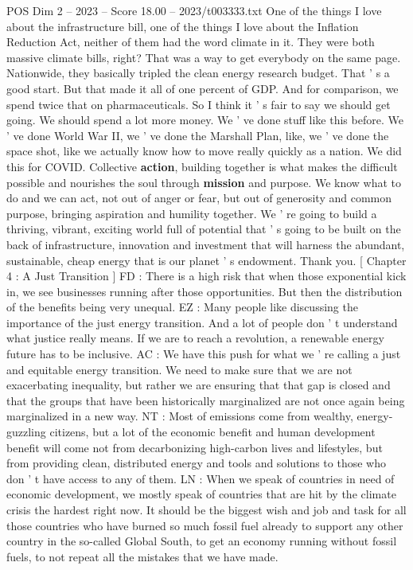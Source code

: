 \begin{textsample}{POS Dim 2 – 2023 – Score 18.00 – 2023/t003333.txt}
One of the things I love about the infrastructure bill, one of the things I love about the Inflation Reduction Act, neither of them had the word climate in it.
They were both massive climate bills, right?
That was a way to get everybody on the same page.
Nationwide, they basically tripled the clean energy research budget.
That ' s a good start.
But that made it all of one percent of GDP.
And for comparison, we spend twice that on pharmaceuticals.
So I think it ' s fair to say we should get going.
We should spend a lot more money.
We ' ve done stuff like this before.
We ' ve done World War II, we ' ve done the Marshall Plan, like, we ' ve done the space shot, like we actually know how to move really quickly as a nation.
We did this for COVID.
Collective \textbf{action}, building together is what makes the difficult possible and nourishes the soul through \textbf{mission} and purpose.
We know what to do and we can act, not out of anger or fear, but out of generosity and common purpose, bringing aspiration and humility together.
We ' re going to build a thriving, vibrant, exciting world full of potential that ' s going to be built on the back of infrastructure, innovation and investment that will harness the abundant, sustainable, cheap energy that is our planet ' s endowment.
Thank you. [ Chapter 4 : A Just Transition ] FD : There is a high risk that when those exponential kick in, we see businesses running after those opportunities.
But then the distribution of the benefits being very unequal.
EZ : Many people like discussing the importance of the just energy transition.
And a lot of people don ' t understand what justice really means.
If we are to reach a revolution, a renewable energy future has to be inclusive.
AC : We have this push for what we ' re calling a just and equitable energy transition.
We need to make sure that we are not exacerbating inequality, but rather we are ensuring that that gap is closed and that the groups that have been historically marginalized are not once again being marginalized in a new way.
NT : Most of emissions come from wealthy, energy-guzzling citizens, but a lot of the economic benefit and human development benefit will come not from decarbonizing high-carbon lives and lifestyles, but from providing clean, distributed energy and tools and solutions to those who don ' t have access to any of them.
LN : When we speak of countries in need of economic development, we mostly speak of countries that are hit by the climate crisis the hardest right now.
It should be the biggest wish and job and task for all those countries who have burned so much fossil fuel already to support any other country in the so-called Global South, to get an economy running without fossil fuels, to not repeat all the mistakes that we have made.

\end{textsample}

